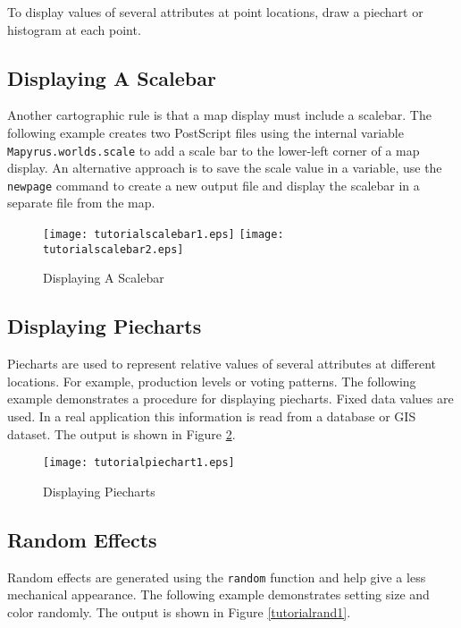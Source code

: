 To display values of several attributes at point locations, draw a
piechart or histogram at each point.

\subsection{Displaying A Scalebar}
\label{tutorialscalebar}

Another cartographic rule is that a map display must include a scalebar.  The
following example creates two PostScript files using the
internal variable \texttt{Mapyrus.worlds.scale} to add a scale bar to the
lower-left corner of a map display.  An alternative approach is to save the
scale value in a variable, use the \texttt{newpage} command to create a new
output file and display the scalebar in a separate file from the map.



\begin{figure}[htb]
\texttt{[image: tutorialscalebar1.eps]}
\texttt{[image: tutorialscalebar2.eps]}
\caption{Displaying A Scalebar}
\label{tutorialscalebar1}
\end{figure}

\subsection{Displaying Piecharts}

Piecharts are used to represent relative values of several attributes at
different locations.  For example, production levels or voting patterns.  The
following example demonstrates a procedure for displaying piecharts.  Fixed
data values are used.  In a real application this information is read from a
database or GIS dataset.  The output is shown in Figure
\ref{tutorialpiechart1}.



\begin{figure}[htb]
\texttt{[image: tutorialpiechart1.eps]}
\caption{Displaying Piecharts}
\label{tutorialpiechart1}
\end{figure}

\subsection{Random Effects}

Random effects are generated using the \texttt{random}
function and help give a less mechanical appearance.
The following example demonstrates setting size and color randomly.
The output is shown in Figure \ref{tutorialrand1}.

